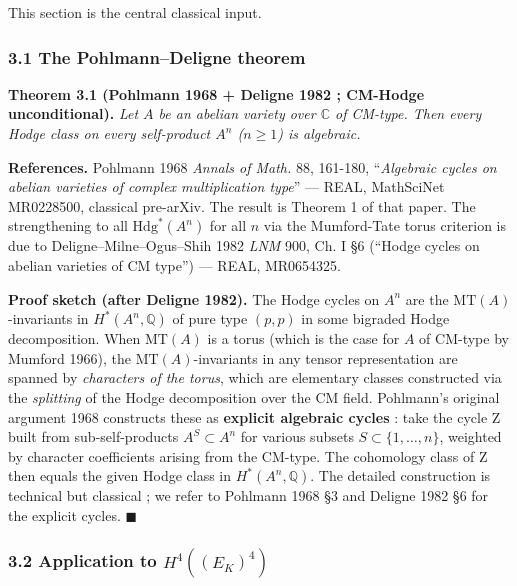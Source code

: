 \documentclass[
  11pt,
  a4paper,
]{article}
\begin{document}
This section is the central classical input.

\hypertarget{the-pohlmanndeligne-theorem}{%
\subsubsection{3.1 The Pohlmann--Deligne theorem}\label{the-pohlmanndeligne-theorem}}

\textbf{Theorem 3.1 (Pohlmann 1968 + Deligne 1982 ; CM-Hodge unconditional).} \emph{Let \(A\) be an abelian variety over \(\mathbb{C}\) of CM-type. Then every Hodge class on every self-product \(A^n\) (\(n \geq 1\)) is algebraic.}

\textbf{References.} Pohlmann 1968 \emph{Annals of Math.} 88, 161-180, ``\emph{Algebraic cycles on abelian varieties of complex multiplication type}'' --- REAL, MathSciNet MR0228500, classical pre-arXiv. The result is Theorem 1 of that paper. The strengthening to all \(\mathrm{Hdg}^*(A^n)\) for all \(n\) via the Mumford-Tate torus criterion is due to Deligne--Milne--Ogus--Shih 1982 \emph{LNM} 900, Ch. I §6 (``Hodge cycles on abelian varieties of CM type'') --- REAL, MR0654325.

\textbf{Proof sketch (after Deligne 1982).} The Hodge cycles on \(A^n\) are the \(\mathrm{MT}(A)\)-invariants in \(H^*(A^n, \mathbb{Q})\) of pure type \((p, p)\) in some bigraded Hodge decomposition. When \(\mathrm{MT}(A)\) is a torus (which is the case for \(A\) of CM-type by Mumford 1966), the \(\mathrm{MT}(A)\)-invariants in any tensor representation are spanned by \emph{characters of the torus}, which are elementary classes constructed via the \emph{splitting} of the Hodge decomposition over the CM field. Pohlmann's original argument 1968 constructs these as \textbf{explicit algebraic cycles} : take the cycle Z built from sub-self-products \(A^{S} \subset A^n\) for various subsets \(S \subset \{1, \ldots, n\}\), weighted by character coefficients arising from the CM-type. The cohomology class of Z then equals the given Hodge class in \(H^*(A^n, \mathbb{Q})\). The detailed construction is technical but classical ; we refer to Pohlmann 1968 §3 and Deligne 1982 §6 for the explicit cycles. \(\blacksquare\)

\hypertarget{application-to-h4e_k4}{%
\subsubsection{\texorpdfstring{3.2 Application to \(H^4((E_K)^4)\)}{3.2 Application to H\^{}4((E\_K)\^{}4)}}\label{application-to-h4e_k4}}
\end{document}
